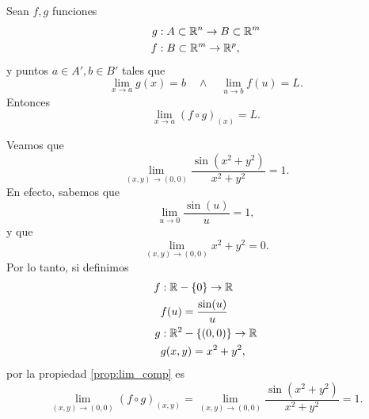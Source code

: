 \documentclass[a4paper]{scrartcl} %
\begin{document}
\begin{propiedad}  \label{prop:lim_comp}
\mbox{}

Sean $f, g$ funciones 
\begin{align*}
 g &:A \subset \mathbb{R}^n \to B \subset \mathbb{R}^m \\
 f &:B \subset \mathbb{R}^m \to \mathbb{R}^p,
\end{align*}
y puntos $a \in A', b \in B'$ tales que 
\[
 \lim_{x \to a} g(x) = b \quad \wedge \quad \lim_{u \to b} f(u) = L.
\]
Entonces
\[
 \lim_{x \to a} \left( f \circ g \right)_{(x)} = L.
\]
\end{propiedad}
\begin{exmp}
 Veamos que 
 \[
  \lim_{(x,y) \to (0,0)} \frac{\sin(x^2 + y^2)}{x^2 + y^2} = 1.
 \]
 En efecto, sabemos que 
  \[
    \lim_{u \to 0} \frac{\sin(u)}{u} = 1,
  \]
  y que
  \[
    \lim_{(x,y) \to (0,0)} x^2 + y^2 = 0.
  \]  
  Por lo tanto, si definimos 
  \begin{align*}
   f&: \mathbb{R} - \{0\} \to \mathbb{R} \\
    &f(u) = \frac{\sin(u)}{u} \\
   g&: \mathbb{R}^2 - \{(0,0)\} \to \mathbb{R} \\
    &g(x,y) = x^2 + y^2,
  \end{align*}
  por la propiedad \eqref{prop:lim_comp} es
  \[
   \lim_{(x,y) \to (0,0)} \left( f \circ g \right)_{(x,y)} = 
   \lim_{(x,y) \to (0,0)} \frac{\sin(x^2 + y^2)}{x^2 + y^2} = 1.
  \]
\end{exmp}
\end{document}
